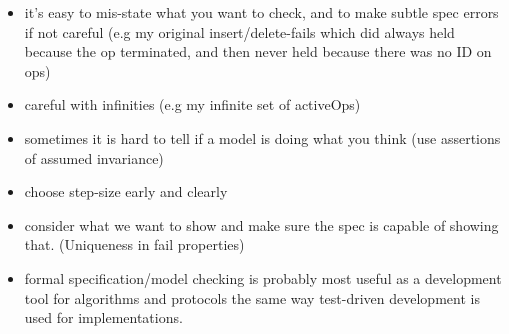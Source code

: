 \documentclass{uit-thesis}
\begin{document}
\begin{itemize}
    \item it's easy to mis-state what you want to check, and to make subtle spec errors if not careful (e.g my original insert/delete-fails which did always held because the op terminated, and then never held because there was no ID on ops)
    \item careful with infinities (e.g my infinite set of activeOps)
    \item sometimes it is hard to tell if a model is doing what you think (use assertions of assumed invariance)
    \item choose step-size early and clearly
    \item consider what we want to show and make sure the spec is capable of showing that. (Uniqueness in fail properties)
    \item formal specification/model checking is probably most useful as a development tool for algorithms and protocols the same way test-driven development is used for implementations.
\end{itemize}
\backmatter
\printbibliography{}
\appendix
{}
\end{document}
